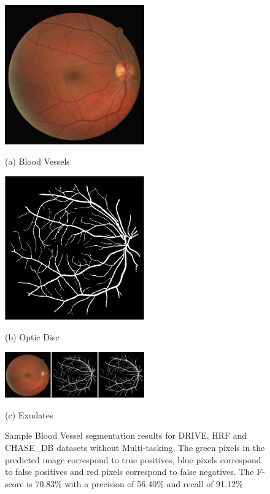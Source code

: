 \documentclass{article}
\begin{document}
\begin{figure}[!ht]
\begin{minipage}[b]{0.7\linewidth}
\centering
\centerline{\includegraphics[width=6cm]{images/19_test_img.png}}
\centerline{(a) Blood Vessels}\medskip
\end{minipage}

\begin{minipage}[b]{0.7\linewidth}
\centering
\centerline{\includegraphics[width=6cm]{images/19_test_gt.png}}
\centerline{(b) Optic Disc}\medskip
\end{minipage}

\begin{minipage}[b]{0.7\linewidth}
\centering
\centerline{\includegraphics[width=6cm]{images/19_test_pred_individual.png}}
\centerline{(c) Exudates}\medskip
\end{minipage}

\caption{Sample Blood Vessel segmentation results for DRIVE, HRF and CHASE\_DB datasets without Multi-tasking. The green pixels in the predicted image correspond to true positives, blue pixels correspond to false positives and  red pixels correspond to false negatives. The F-score is 70.83\% with a precision of 56.40\% and recall of 91.12\%}
\label{fig:segmentation_results}

\end{figure}
\end{document}
